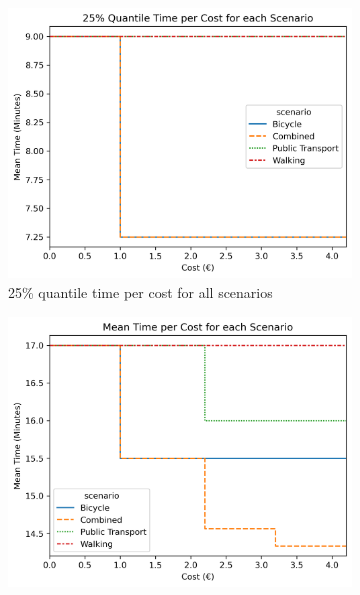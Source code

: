 \begin{figure}
     \centering
     \begin{subfigure}[b]{0.48\textwidth}
         \centering
         \includegraphics[width=\textwidth]{Figures/results/metric_cost/quantile_25_time_per_cost_for_each_scenario_without_car.png}
         \caption{25\% quantile time per cost for all scenarios}
         \label{fig:25_quantile_time_per_cost}
     \end{subfigure}
     \hfill
     \begin{subfigure}[b]{0.48\textwidth}
         \centering
         \includegraphics[width=\textwidth]{Figures/results/metric_cost/quantile_75_time_per_cost_for_each_scenario_without_car.png}

\end{subfigure}
\end{figure}
